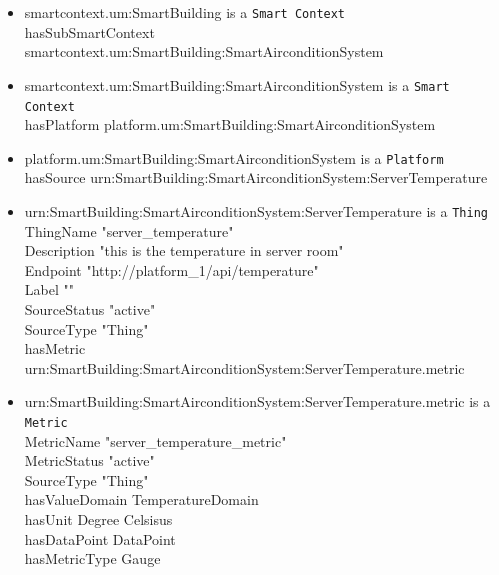 \documentclass[runningheads,a4paper]{llncs}
\begin{document}
\begin{itemize}
\item smartcontext.um:SmartBuilding is a \texttt{Smart Context} \\
\hspace*{0.5cm} hasSubSmartContext smartcontext.um:SmartBuilding:SmartAirconditionSystem \\
\item smartcontext.um:SmartBuilding:SmartAirconditionSystem is a \texttt{Smart Context} \\ 
\hspace*{0.5cm} hasPlatform platform.um:SmartBuilding:SmartAirconditionSystem \\
\item platform.um:SmartBuilding:SmartAirconditionSystem is a \texttt{Platform} \\
\hspace*{0.5cm} hasSource urn:SmartBuilding:SmartAirconditionSystem:ServerTemperature	\\
\item urn:SmartBuilding:SmartAirconditionSystem:ServerTemperature is a \texttt{Thing} \\
\hspace*{0.5cm} ThingName "server\_temperature" \\ 
\hspace*{0.5cm} Description "this is the temperature in server room" \\
\hspace*{0.5cm} Endpoint "http://platform\_1/api/temperature" \\ 
\hspace*{0.5cm} Label "" \\
\hspace*{0.5cm} SourceStatus "active" \\
\hspace*{0.5cm} SourceType "Thing" \\
\hspace*{0.5cm} hasMetric urn:SmartBuilding:SmartAirconditionSystem:ServerTemperature.metric \\
\item urn:SmartBuilding:SmartAirconditionSystem:ServerTemperature.metric is a \texttt{Metric}\\
\hspace*{0.5cm} MetricName "server\_temperature\_metric"\\
\hspace*{0.5cm} MetricStatus "active"\\
\hspace*{0.5cm} SourceType "Thing"\\
\hspace*{0.5cm} hasValueDomain TemperatureDomain\\
\hspace*{0.5cm} hasUnit Degree Celsisus\\
\hspace*{0.5cm} hasDataPoint DataPoint\\
\hspace*{0.5cm} hasMetricType Gauge\\
\end{itemize}
\end{document}
